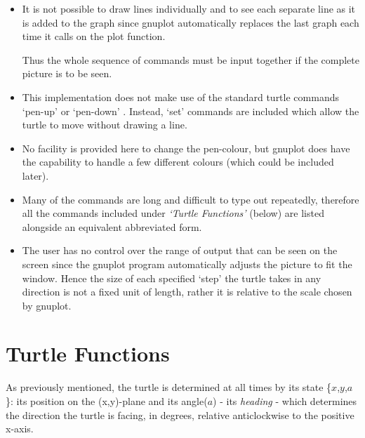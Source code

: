 \documentclass[11pt]{article}
\begin{document}
\begin{itemize}
 \item It is not possible to draw lines individually and to see each
        separate line as it is added to the graph since gnuplot
        automatically replaces the last graph each time it calls on
        the plot function.

       Thus the whole sequence of commands must be input together if
        the complete picture is to be seen.
 \item This implementation does not make use of the standard turtle
        commands `pen-up' or `pen-down' . Instead, `set' commands are
        included which allow the turtle to move without drawing a line.
 \item No facility is provided here to change the pen-colour, but gnuplot
        does have the capability to handle a few different colours (which
        could be included later).
 \item Many of the commands are long and difficult to type out repeatedly,
        therefore all the commands included under {\em `Turtle Functions'}
        (below) are listed alongside an equivalent abbreviated form.
 \item The user has no control over the range of output that can be seen
        on the screen since the gnuplot program automatically adjusts the
        picture to fit the window. Hence the size of each specified `step'
        the turtle takes in any direction is not a fixed unit of length,
        rather it is relative to the scale chosen by gnuplot.
\end{itemize}


\section{Turtle Functions}
 As previously mentioned, the turtle is determined at all times by its
state \{$x$,$y$,$a$\}: its position on the \mbox{(x,y)-plane} and its
angle($a$) - its {\em heading} - which determines the direction the
turtle is facing, in degrees, relative anticlockwise to the positive
x-axis.     
       
\end{document}
